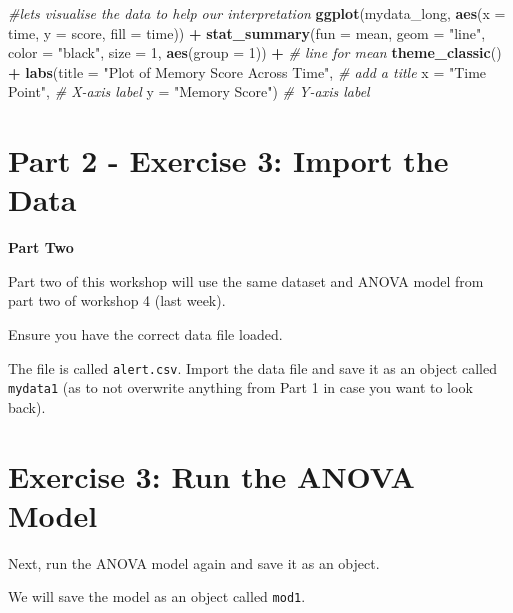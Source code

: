 \documentclass[
]{book}
\newenvironment{Shaded}{\begin{snugshade}}{\end{snugshade}}
\newcommand{\AttributeTok}[1]{\textcolor[rgb]{0.13,0.29,0.53}{#1}}
\newcommand{\CommentTok}[1]{\textcolor[rgb]{0.56,0.35,0.01}{\textit{#1}}}
\newcommand{\DecValTok}[1]{\textcolor[rgb]{0.00,0.00,0.81}{#1}}
\newcommand{\FunctionTok}[1]{\textcolor[rgb]{0.13,0.29,0.53}{\textbf{#1}}}
\newcommand{\NormalTok}[1]{#1}
\newcommand{\SpecialCharTok}[1]{\textcolor[rgb]{0.81,0.36,0.00}{\textbf{#1}}}
\newcommand{\StringTok}[1]{\textcolor[rgb]{0.31,0.60,0.02}{#1}}
\let\oldsection\section
\renewcommand{\section}{\needspace{5\baselineskip}\oldsection}
\begin{document}
\begin{Shaded}
\begin{Highlighting}[]
\CommentTok{\#let\textquotesingle{}s visualise the data to help our interpretation}
\FunctionTok{ggplot}\NormalTok{(mydata\_long, }\FunctionTok{aes}\NormalTok{(}\AttributeTok{x =}\NormalTok{ time, }\AttributeTok{y =}\NormalTok{ score, }\AttributeTok{fill =}\NormalTok{ time)) }\SpecialCharTok{+}
  \FunctionTok{stat\_summary}\NormalTok{(}\AttributeTok{fun =}\NormalTok{ mean, }\AttributeTok{geom =} \StringTok{"line"}\NormalTok{, }\AttributeTok{color =} \StringTok{"black"}\NormalTok{, }\AttributeTok{size =} \DecValTok{1}\NormalTok{, }\FunctionTok{aes}\NormalTok{(}\AttributeTok{group =} \DecValTok{1}\NormalTok{)) }\SpecialCharTok{+}  \CommentTok{\# line for mean}
  \FunctionTok{theme\_classic}\NormalTok{() }\SpecialCharTok{+}
  \FunctionTok{labs}\NormalTok{(}\AttributeTok{title =} \StringTok{"Plot of Memory Score Across Time"}\NormalTok{,  }\CommentTok{\# add a title}
       \AttributeTok{x =} \StringTok{"Time Point"}\NormalTok{,  }\CommentTok{\# X{-}axis label}
       \AttributeTok{y =} \StringTok{"Memory Score"}\NormalTok{)  }\CommentTok{\# Y{-}axis label}
\end{Highlighting}
\end{Shaded}

\section{Part 2 - Exercise 3: Import the Data}\label{part-2---exercise-3-import-the-data}

\textbf{Part Two}

Part two of this workshop will use the same dataset and ANOVA model from part two of workshop 4 (last week).

Ensure you have the correct data file loaded.

The file is called \texttt{alert.csv}. Import the data file and save it as an object called \texttt{mydata1} (as to not overwrite anything from Part 1 in case you want to look back).

\section{Exercise 3: Run the ANOVA Model}\label{exercise-3-run-the-anova-model}

Next, run the ANOVA model again and save it as an object.

We will save the model as an object called \texttt{mod1}.
\end{document}
